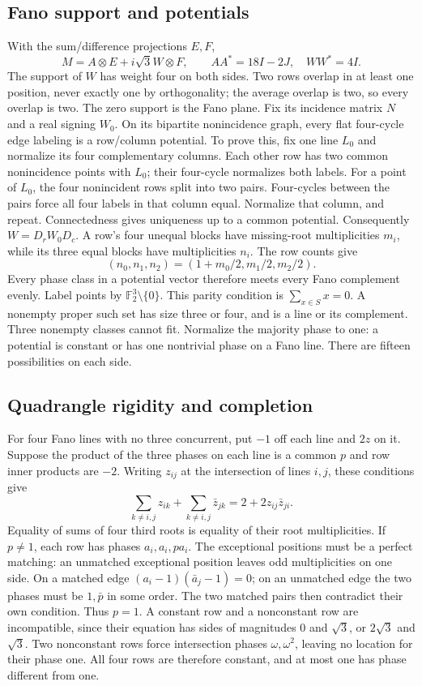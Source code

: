 \subsection{Fano support and potentials}
With the sum/difference projections $E,F$,
\[M=A\otimes E+i\sqrt3W\otimes F,\qquad AA^*=18I-2J,\quad WW^*=4I.\]
The support of $W$ has weight four on both sides. Two rows overlap in at least one position, never exactly one by orthogonality; the average overlap is two, so every overlap is two. The zero support is the Fano plane. Fix its incidence matrix $N$ and a real signing $W_0$.
On its bipartite nonincidence graph, every flat four-cycle edge labeling is a row/column potential. To prove this, fix one line $L_0$ and normalize its four complementary columns. Each other row has two common nonincidence points with $L_0$; their four-cycle normalizes both labels. For a point of $L_0$, the four nonincident rows split into two pairs. Four-cycles between the pairs force all four labels in that column equal. Normalize that column, and repeat. Connectedness gives uniqueness up to a common potential. Consequently $W=D_rW_0D_c$.
A row's four unequal blocks have missing-root multiplicities $m_i$, while its three equal blocks have multiplicities $n_i$. The row counts give
\[(n_0,n_1,n_2)=(1+m_0/2,m_1/2,m_2/2).\]
Every phase class in a potential vector therefore meets every Fano complement evenly. Label points by $\mathbb F_2^3\setminus\{0\}$. This parity condition is $\sum_{x\in S}x=0$. A nonempty proper such set has size three or four, and is a line or its complement. Three nonempty classes cannot fit. Normalize the majority phase to one: a potential is constant or has one nontrivial phase on a Fano line. There are fifteen possibilities on each side.

\subsection{Quadrangle rigidity and completion}
For four Fano lines with no three concurrent, put $-1$ off each line and $2z$ on it. Suppose the product of the three phases on each line is a common $p$ and row inner products are $-2$. Writing $z_{ij}$ at the intersection of lines $i,j$, these conditions give
\[\sum_{k\ne i,j}z_{ik}+\sum_{k\ne i,j}\bar z_{jk}=2+2z_{ij}\bar z_{ji}.\]
Equality of sums of four third roots is equality of their root multiplicities. If $p\ne1$, each row has phases $a_i,a_i,pa_i$. The exceptional positions must be a perfect matching: an unmatched exceptional position leaves odd multiplicities on one side. On a matched edge $(a_i-1)(\bar a_j-1)=0$; on an unmatched edge the two phases must be $1,\bar p$ in some order. The two matched pairs then contradict their own condition. Thus $p=1$. A constant row and a nonconstant row are incompatible, since their equation has sides of magnitudes $0$ and $\sqrt3$, or $2\sqrt3$ and $\sqrt3$. Two nonconstant rows force intersection phases $\omega,\omega^2$, leaving no location for their phase one. All four rows are therefore constant, and at most one has phase different from one.

